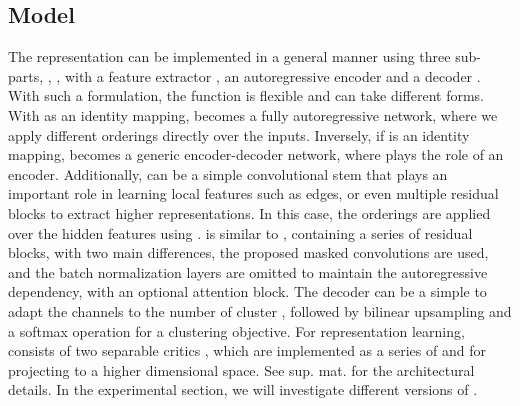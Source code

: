 \subsection{Model} \label{mdl}
The representation  can be implemented in a general manner using three sub-parts, 
\ie, , with a feature extractor , an autoregressive encoder
 and a decoder . With such a formulation, the function  is flexible and
can take different forms. With  as an identity mapping,  becomes a fully autoregressive
network, where we apply different orderings directly over
the inputs. Inversely, if 
is an identity mapping,  becomes a generic encoder-decoder network,
where  plays the role of 
an encoder.
Additionally,  can be a simple convolutional stem that plays
an important role in learning local features such as edges, or even multiple residual blocks \cite{resnet}
to extract higher representations. In this case, the orderings are applied over 
the hidden features using .  is similar to ,
containing a series of residual blocks,
with two main differences, the proposed masked convolutions are used,
and the batch normalization \cite{batchnorm}
layers are omitted to maintain the autoregressive dependency,
with an optional attention block.
The decoder  can be a simple  to adapt the channels
to the number of cluster , followed by bilinear upsampling and
a softmax operation for a clustering objective.
For representation learning,  consists of two separable critics ,
which are implemented as a series of 
and  for projecting to a higher dimensional space. See sup. mat. for
the architectural details. In the experimental section, we will investigate different versions of .

